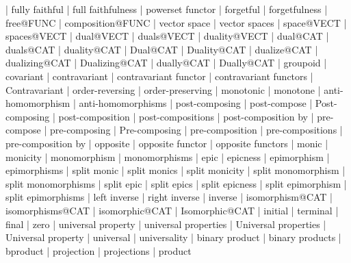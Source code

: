     |   fully faithful
    |   full faithfulness
    |   powerset functor
    |   forgetful
    |   forgetfulness
    |   free@FUNC
    |   composition@FUNC
    |   vector space
    |   vector spaces
    |   space@VECT
    |   spaces@VECT
    |   dual@VECT
    |   duals@VECT
    |   duality@VECT
    |   dual@CAT
    |   duals@CAT
    |   duality@CAT
    |   Dual@CAT
    |   Duality@CAT
    |   dualize@CAT
    |   dualizing@CAT
    |   Dualizing@CAT
    |   dually@CAT
    |   Dually@CAT
    |   groupoid
    |   covariant
    |   contravariant
    |   contravariant functor
    |   contravariant functors
    |   Contravariant
    |   order-reversing
    |   order-preserving
    |   monotonic
    |   monotone
    |   anti-homomorphism
    |   anti-homomorphisms
    |   post-composing
    |   post-compose
    |   Post-composing
    |   post-composition
    |   post-compositions
    |   post-composition by
    |   pre-compose
    |   pre-composing
    |   Pre-composing
    |   pre-composition
    |   pre-compositions
    |   pre-composition by
    |   opposite
    |   opposite functor
    |   opposite functors
    |   monic
    |   monicity
    |   monomorphism
    |   monomorphisms
    |   epic
    |   epicness
    |   epimorphism
    |   epimorphisms
    |   split monic
    |   split monics
    |   split monicity
    |   split monomorphism
    |   split monomorphisms
    |   split epic
    |   split epics
    |   split epicness
    |   split epimorphism
    |   split epimorphisms
    |   left inverse
    |   right inverse
    |   inverse
    |   isomorphism@CAT
    |   isomorphisms@CAT
    |   isomorphic@CAT
    |   Isomorphic@CAT
    |   initial
    |   terminal
    |   final
    |   zero
    |   universal property
    |   universal properties
    |   Universal properties
    |   Universal property
    |   universal
    |   universality
    |   binary product
    |   binary products
    |   bproduct
    |   projection
    |   projections
    |   product
